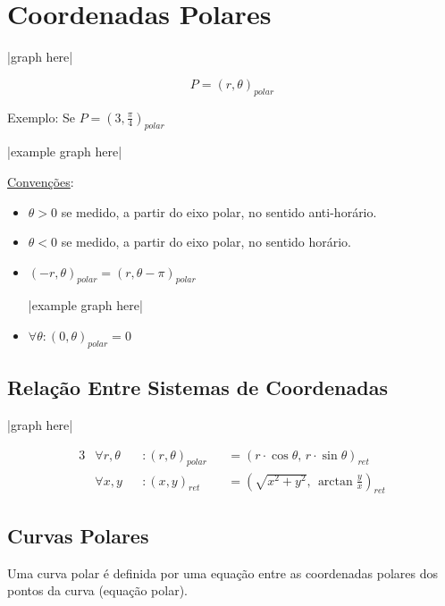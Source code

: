 \documentclass{article}
\begin{document}
\section{Coordenadas Polares}
\centerline{|graph here|}
\[ P = {(r, \theta)}_{polar} \]

Exemplo: Se $P = {\left(3, \frac{\pi}{4}\right)}_{polar}$ \\
\centerline{|example graph here|}
\underline{Conven\c{c}\~oes}:
\begin{itemize}
  \item $\theta > 0$ se medido, a partir do eixo polar, no sentido anti-hor\'ario.
  \item $\theta < 0$ se medido, a partir do eixo polar, no sentido hor\'ario.
  \item ${(-r, \theta)}_{polar} = {(r, \theta - \pi)}_{polar}$ \\
    \centerline{|example graph here|}
  \item $\forall \theta: {(0, \theta)}_{polar} = 0$
\end{itemize}

\subsection{Rela\c{c}\~ao Entre Sistemas de Coordenadas}
\centerline{|graph here|}
\begin{alignat*}{3}
  &\forall r, \theta &&: {(r, \theta)}_{polar} &&= {(r \cdot \cos \theta,\, r \cdot \sin \theta)}_{ret} \\
  &\forall x, y &&: {(x, y)}_{ret} &&= {\left(\sqrt{x^2 + y^2},\, \arctan{\frac{y}{x}}\right)}_{ret}
\end{alignat*}

\subsection{Curvas Polares}
Uma curva polar \'e definida por uma equa\c{c}\~ao entre as coordenadas polares dos pontos da curva (equa\c{c}\~ao polar). \\
\end{document}
